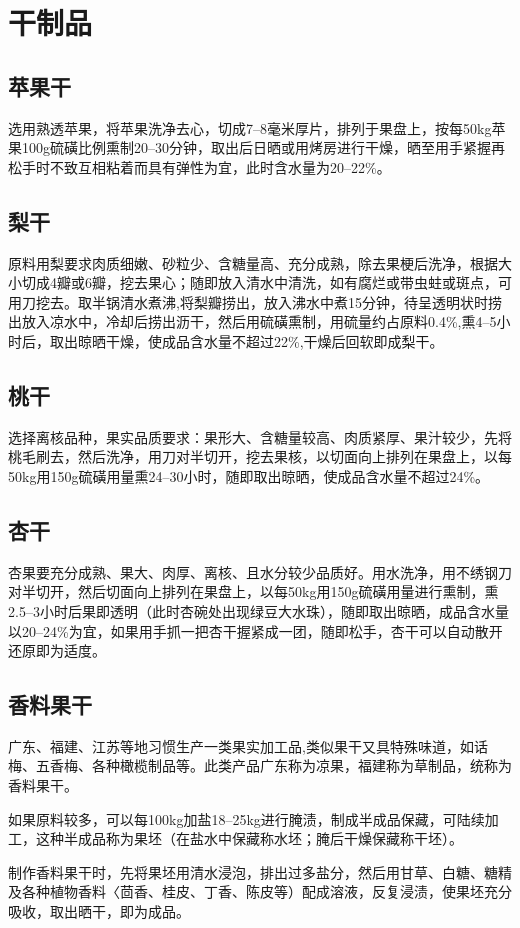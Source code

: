 \documentclass{ctexbook}
\begin{document}
\section{干制品}
\subsection{苹果干}
选用熟透苹果，将苹果洗净去心，切成7--8毫米厚片，排列于果盘上，按每50kg苹果100g硫磺比例熏制20--30分钟，取出后日晒或用烤房进行干燥，晒至用手紧握再松手时不致互相粘着而具有弹性为宜，此时含水量为20--22\%。
\subsection{梨干}
原料用梨要求肉质细嫩、砂粒少、含糖量高、充分成熟，除去果梗后洗净，根据大小切成4瓣或6瓣，挖去果心；随即放入清水中清洗，如有腐烂或带虫蛀或斑点，可用刀挖去。取半锅清水煮沸,将梨瓣捞出，放入沸水中煮15分钟，待呈透明状时捞出放入凉水中，冷却后捞出沥干，然后用硫磺熏制，用硫量约占原料0.4\%,熏4--5小时后，取出晾晒干燥，使成品含水量不超过22\%,干燥后回软即成梨干。
\subsection{桃干}
选择离核品种，果实品质要求：果形大、含糖量较高、肉质紧厚、果汁较少，先将桃毛刷去，然后洗净，用刀对半切开，挖去果核，以切面向上排列在果盘上，以每50kg用150g硫磺用量熏24--30小时，随即取出晾晒，使成品含水量不超过24\%。
\subsection{杏干}
杏果要充分成熟、果大、肉厚、离核、且水分较少品质好。用水洗净，用不绣钢刀对半切开，然后切面向上排列在果盘上，以每50kg用150g硫磺用量进行熏制，熏2.5--3小时后果即透明（此时杏碗处出现绿豆大水珠），随即取出晾晒，成品含水量以20--24\%为宜，如果用手抓一把杏干握紧成一团，随即松手，杏干可以自动散开还原即为适度。
\subsection{香料果干}
广东、福建、江苏等地习惯生产一类果实加工品,类似果干又具特殊味道，如话梅、五香梅、各种橄榄制品等。此类产品广东称为凉果，福建称为草制品，统称为香料果干。

如果原料较多，可以每100kg加盐18--25kg进行腌渍，制成半成品保藏，可陆续加工，这种半成品称为果坯（在盐水中保藏称水坯；腌后干燥保藏称干坯）。

制作香料果干时，先将果坯用清水浸泡，排出过多盐分，然后用甘草、白糖、糖精及各种植物香料〈茴香、桂皮、丁香、陈皮等）配成溶液，反复浸渍，使果坯充分吸收，取出晒干，即为成品。
\end{document}
